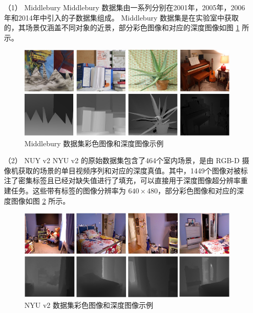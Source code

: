 \begin{itemize}
	\item[（1）] Middlebury \newline	
	Middlebury 数据集由一系列分别在2001年，2005年，2006年和2014年中引入的子数据集组成。 Middlebury 数据集是在实验室中获取的，其场景仅涵盖不同对象的近景，部分彩色图像和对应的深度图像如图 \ref{fig:fig4-1} 所示。
	
	\begin{figure}[!htbp]
	\centering
	\includegraphics{figures/27.png}
	\caption{Middlebury 数据集彩色图像和深度图像示例}
	\label{fig:fig4-1}
	\vspace{-0.8cm}  %
\end{figure}

\newpage
\item[（2）] NUY v2 \newline
NYU v2 的原始数据集包含了464个室内场景，是由 RGB-D 摄像机获取的场景的单目视频序列和对应的深度真值。其中，1449个图像对被标注了密集标签且已经对缺失值进行了填充，可以直接用于深度图像超分辨率重建任务。这些带有标签的图像分辨率为 $640 \times 480$，部分彩色图像和对应的深度图像如图 \ref{fig:fig4-2} 所示。

	\begin{figure}[!htbp]
	\centering
	\includegraphics{figures/28.png}
	\caption{NYU v2 数据集彩色图像和深度图像示例}
	\label{fig:fig4-2}
	\vspace{-0.8cm}  %
	\end{figure}
	
\end{itemize}

